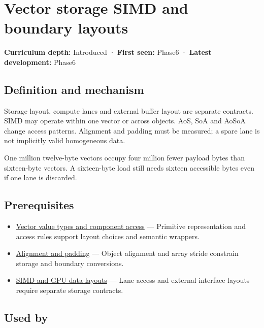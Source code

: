 \hypertarget{appendix-26bf6bf2fb8b}{}\label{referencestart:appendix-26bf6bf2fb8b}
\section{Vector storage SIMD and boundary layouts}\label{appendix-26bf6bf2fb8b-vector-storage-simd-and-boundary-layouts}

\textbf{Curriculum depth:} Introduced · \textbf{First seen:} Phase6 · \textbf{Latest development:} Phase6

\subsection{Definition and mechanism}\label{appendix-26bf6bf2fb8b-definition-and-mechanism}

Storage layout, compute lanes and external buffer layout are separate contracts. SIMD may operate within one vector or across objects. AoS, SoA and AoSoA change access patterns. Alignment and padding must be measured; a spare lane is not implicitly valid homogeneous data.

One million twelve-byte vectors occupy four million fewer payload bytes than sixteen-byte vectors. A sixteen-byte load still needs sixteen accessible bytes even if one lane is discarded.

\subsection{Prerequisites}\label{appendix-26bf6bf2fb8b-prerequisites}

\begin{itemize}
\tightlist
\item
  \hyperref[appendix-37a39984ba66]{Vector value types and component access} --- Primitive representation and access rules support layout choices and semantic wrappers.
\item
  \hyperref[appendix-a1f7c53b4742]{Alignment and padding} --- Object alignment and array stride constrain storage and boundary conversions.
\item
  \hyperref[appendix-3c7b1a56de01]{SIMD and GPU data layouts} --- Lane access and external interface layouts require separate storage contracts.
\end{itemize}

\subsection{Used by}\label{appendix-26bf6bf2fb8b-used-by}


